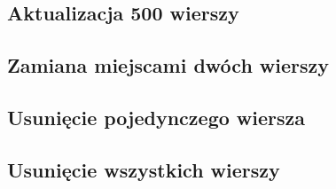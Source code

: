 \subsection{Aktualizacja 500 wierszy}
\subsection{Zamiana miejscami dwóch wierszy}
\subsection{Usunięcie pojedynczego wiersza}
\subsection{Usunięcie wszystkich wierszy}
















